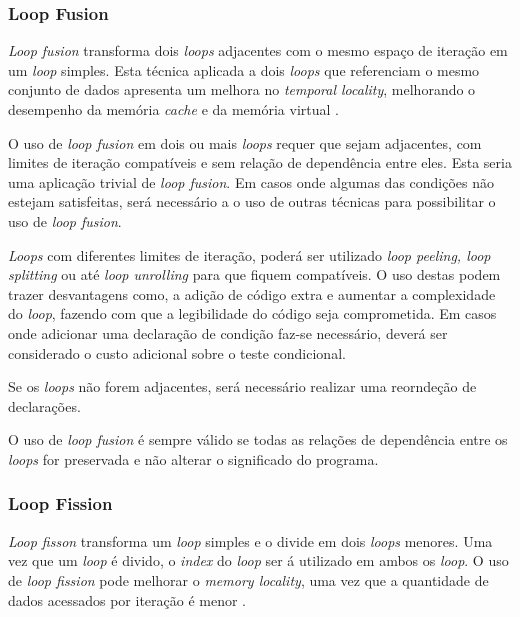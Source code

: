\documentclass[12pt]{article}
\begin{document}
\subsubsection{Loop Fusion}

\textit{Loop fusion} transforma dois \textit{loops} adjacentes com o mesmo
espaço de iteração em um \textit{loop} simples.
Esta técnica aplicada a dois \textit{loops} que referenciam o mesmo conjunto de
dados apresenta um melhora no \textit{temporal locality}, melhorando o
desempenho da memória \textit{cache} e da memória virtual \cite{Wolf:1996}.

O uso de \textit{loop fusion} em dois ou mais \textit{loops} requer que sejam 
adjacentes, com limites de iteração compatíveis e sem relação de dependência 
entre eles. 
Esta seria uma aplicação trivial de \textit{loop fusion}.
Em casos onde algumas das condições não estejam satisfeitas, será necessário a o
uso de outras técnicas para possibilitar o uso de \textit{loop fusion}.

\textit{Loops} com diferentes limites de iteração, poderá ser utilizado
\textit{loop peeling, loop splitting} ou até \textit{loop unrolling} para que
fiquem compatíveis. 
O uso destas podem trazer desvantagens como, a adição de código extra e
aumentar a complexidade do \textit{loop}, fazendo com que a legibilidade do
código seja comprometida.
Em casos onde adicionar uma declaração de condição faz-se necessário, deverá ser
considerado o custo adicional sobre o teste condicional.

Se os \textit{loops} não forem adjacentes, será necessário realizar uma
reorndeção de declarações.

O uso de \textit{loop fusion} é sempre válido se todas as relações de 
dependência entre os \textit{loops} for preservada e não alterar o significado do
programa. 

\subsubsection{Loop Fission}

\textit{Loop fisson} transforma um \textit{loop} simples e o divide em dois
\textit{loops} menores. 
Uma vez que um \textit{loop} é divido, o \textit{index} do \textit{loop} ser á
utilizado em ambos os \textit{loop}.
O uso de \textit{loop fission} pode melhorar o \textit{memory locality}, uma vez
que a quantidade de dados acessados por iteração é menor \cite{hpcfpc}.
\end{document}
